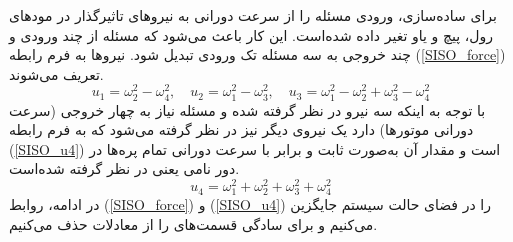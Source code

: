 \documentclass{CCI2020}
\begin{document}
برای ساده‌سازی، ورودی مسئله را از سرعت دورانی به نیروهای تاثیرگذار در مودهای رول، پیچ و یاو تغیر داده شده‌است. این کار باعث می‌شود که مسئله از چند ورودی و چند خروجی به سه مسئله تک ورودی تبدیل شود. نیروها به فرم رابطه 
(\ref{SISO_force})
تعریف می‌شوند.
\begin{equation}\label{SISO_force}
	u_1 = \omega_2^2 - \omega_4^2, \quad
	u_2 = \omega_1^2 - \omega_3^2, \quad
	u_3 = \omega_1^2 - \omega_2^2  + \omega_3^2 - \omega_4^2
\end{equation}
با توجه به اینکه سه نیرو در نظر گرفته ‌شده و مسئله نیاز به چهار خروجی (سرعت دورانی موتورها) دارد یک نیروی دیگر نیز در نظر گرفته ‌می‌شود که به فرم رابطه 
(\ref{SISO_u4})
است و مقدار آن به‌صورت ثابت و برابر با سرعت دورانی تمام پره‌ها در دور نامی یعنی
در نظر گرفته ‌شده‌‌است.
\begin{equation}\label{SISO_u4}
	u_4 = \omega_1^2 + \omega_2^2  + \omega_3^2 + \omega_4^2
\end{equation}
در ادامه، روابط 
(\ref{SISO_force})
و
(\ref{SISO_u4})
را در فضای حالت سیستم جایگزین می‌کنیم و برای سادگی قسمت‌های 
را از معادلات حذف می‌کنیم.
\end{document}
